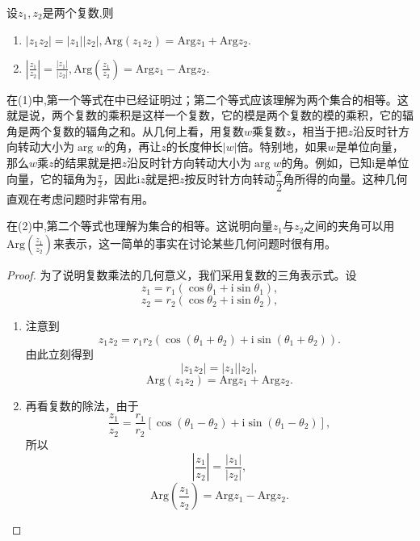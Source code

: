 \documentclass[../../main.tex]{subfiles}
\begin{document}
\begin{theorem}\label{theorem:复数辐角的性质}
设$z_1,z_2$是两个复数,则
\begin{enumerate}[(1)]
\item $|z_1z_2| = |z_1||z_2|,\mathrm{Arg}(z_1z_2) = \mathrm{Arg}z_1 + \mathrm{Arg}z_2.$

\item $\left| \frac{z_1}{z_2} \right| = \frac{|z_1|}{|z_2|},
\mathrm{Arg}\left( \frac{z_1}{z_2} \right) = \mathrm{Arg}z_1 - \mathrm{Arg}z_2.$
\end{enumerate}
\end{theorem}
\begin{note}
在(1)中,第一个等式在中已经证明过；第二个等式应该理解为两个集合的相等。这就是说，两个复数的乘积是这样一个复数，它的模是两个复数的模的乘积，它的辐角是两个复数的辐角之和。从几何上看，用复数\(w\)乘复数\(z\)，相当于把\(z\)沿反时针方向转动大小为\(\arg w\)的角，再让\(z\)的长度伸长\(|w|\)倍。特别地，如果\(w\)是单位向量，那么\(w\)乘\(z\)的结果就是把\(z\)沿反时针方向转动大小为\(\arg w\)的角。例如，已知\(\mathrm{i}\)是单位向量，它的辐角为\(\frac{\pi}{2}\)，因此\(\mathrm{i}z\)就是把\(z\)按反时针方向转动\(\dfrac{\pi}{2}\)角所得的向量。这种几何直观在考虑问题时非常有用。

在(2)中,第二个等式也理解为集合的相等。这说明向量\(z_1\)与\(z_2\)之间的夹角可以用\(\mathrm{Arg}\left( \frac{z_1}{z_2} \right)\)来表示，这一简单的事实在讨论某些几何问题时很有用。
\end{note}
\begin{proof}
为了说明复数乘法的几何意义，我们采用复数的三角表示式。设
\[
z_1 = r_1(\cos\theta_1 + \mathrm{i}\sin\theta_1),
\]
\[
z_2 = r_2(\cos\theta_2 + \mathrm{i}\sin\theta_2),
\]
\begin{enumerate}[(1)]
\item 注意到
\[
z_1z_2 = r_1r_2(\cos(\theta_1 + \theta_2) + \mathrm{i}\sin(\theta_1 + \theta_2)).
\]
由此立刻得到
\[
|z_1z_2| = |z_1||z_2|,
\]
\[
\mathrm{Arg}(z_1z_2) = \mathrm{Arg}z_1 + \mathrm{Arg}z_2.
\]

\item 再看复数的除法，由于
\[
\frac{z_1}{z_2} = \frac{r_1}{r_2}[\cos(\theta_1 - \theta_2) + \mathrm{i}\sin(\theta_1 - \theta_2)],
\]
所以
\[
\left| \frac{z_1}{z_2} \right| = \frac{|z_1|}{|z_2|},
\]
\[
\mathrm{Arg}\left( \frac{z_1}{z_2} \right) = \mathrm{Arg}z_1 - \mathrm{Arg}z_2.
\]
\end{enumerate}
\end{proof}
\end{document}
